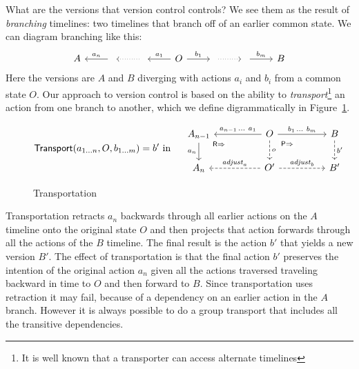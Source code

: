 \documentclass[english,submission]{programming}
\theoremstyle{definition}
\begin{document}
What are the versions that version control controls? We see them as the result of \textit{branching} timelines: two timelines that branch off of an earlier common state. We can diagram branching like this:
\[\begin{tikzcd}
	A & {} & {} & O & {} & {} & B
	\arrow["{{a_n}}"', from=1-2, to=1-1]
	\arrow[dotted, from=1-3, to=1-2]
	\arrow["{{a_1}}"', from=1-4, to=1-3]
	\arrow["{b_1}", from=1-4, to=1-5]
	\arrow[dotted, from=1-5, to=1-6]
	\arrow["{b_m}", from=1-6, to=1-7]
\end{tikzcd}\]
Here the versions are $A$ and $B$ diverging with actions $a_i$ and $b_i$ from a common state $O$. Our approach to version control is based on the ability to \textit{transport}\footnote{It is well known that a transporter can access alternate timelines\cite{mirrormirror}} an action from one branch to another, which we define digrammatically in Figure~\ref{fig:transportation}.
\vspace{-16pt}
\begin{figure}[h]
\[
\textsf{Transport}(a_{1\ldots n}, O, b_{1\ldots m}) = b' \textrm{ in }\quad
\begin{tikzcd}[column sep = huge]
	A_{n-1} & O & B \\
	A_n & {O'} & {B'}
	\arrow["{a_n}"', from=1-1, to=2-1]
	\arrow["{\textsf{R}\Rightarrow}"{description, pos=0.1}, draw=none, from=1-1, to=2-2]
	\arrow["{a_{n-1}\,\ldots\  a_1}"', from=1-2, to=1-1]
	\arrow["{b_1\,\ldots \  b_m}", from=1-2, to=1-3]
	\arrow["o", dashed, from=1-2, to=2-2]
	\arrow["{\textsf{P}\Rightarrow}"{description, pos=0.2}, draw=none, from=1-2, to=2-3]
	\arrow["{b'}", dashed, from=1-3, to=2-3]
	\arrow["{\mathit{adjust}_a}"', dashed, from=2-2, to=2-1]
	\arrow["{\mathit{adjust}_b}", dashed, from=2-2, to=2-3]
\end{tikzcd}\]
\vspace{-16pt}
\caption{Transportation}
\label{fig:transportation}
\end{figure}

Transportation retracts $a_n$ backwards through all earlier actions on the $A$ timeline onto the original state $O$ and then projects that action forwards through all the actions of the $B$ timeline. The final result is the action $b'$ that yields a new version $B'$. The effect of transportation is that the final action $b'$ preserves the intention of the original action $a_n$ given all the actions traversed traveling backward in time to $O$ and then forward to $B$.
Since transportation uses retraction it may fail, because of a dependency on an earlier action in the $A$ branch. However it is always possible to do a group transport that includes all the transitive dependencies.
\end{document}
